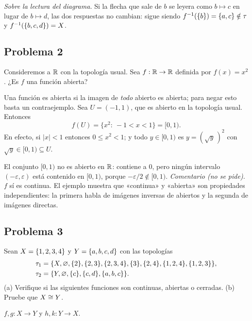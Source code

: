 \emph{Sobre la lectura del diagrama.} Si la flecha que sale de $b$ se leyera como $b\mapsto c$ en lugar de
$b\mapsto d$, las dos respuestas no cambian: sigue siendo $f^{-1}(\{b\})=\{a,c\}\notin\tau$ y
$f^{-1}(\{b,c,d\})=X$.

\subsection{Problema 2}
\begin{enunciado}
Consideremos a $\mathbb{R}$ con la topología usual. Sea $f:\mathbb{R}\to\mathbb{R}$ definida por $f(x)=x^2$. ¿Es $f$ una función abierta?
\end{enunciado}
Una función es abierta si la imagen de \emph{todo} abierto es abierta; para negar esto basta un contraejemplo. Sea
$U=(-1,1)$, que es abierto en la topología usual. Entonces
\[ f(U)=\{x^2:\ -1<x<1\}=[0,1). \]
En efecto, si $|x|<1$ entonces $0\le x^2<1$; y todo $y\in[0,1)$ es $y=(\sqrt{y}\,)^2$ con $\sqrt{y}\in[0,1)\subseteq U$.

El conjunto $[0,1)$ no es abierto en $\mathbb{R}$: contiene a $0$, pero ningún intervalo $(-\varepsilon,\varepsilon)$ está
contenido en $[0,1)$, porque $-\varepsilon/2\notin[0,1)$.
\resp{$f(x)=x^2$ \textbf{no es una función abierta}: $f\big((-1,1)\big)=[0,1)$ no es abierto.}
\emph{Comentario (no se pide).} $f$ sí es continua. El ejemplo muestra que «continua» y «abierta» son propiedades
independientes: la primera habla de imágenes inversas de abiertos y la segunda de imágenes directas.

\subsection{Problema 3}
\begin{enunciado}
Sean $X=\{1,2,3,4\}$ y $Y=\{a,b,c,d\}$ con las topologías
\begin{align*}
\tau_1&=\{X,\varnothing,\{2\},\{2,3\},\{2,3,4\},\{3\},\{2,4\},\{1,2,4\},\{1,2,3\}\},\\
\tau_2&=\{Y,\varnothing,\{c\},\{c,d\},\{a,b,c\}\}.
\end{align*}
(a) Verifique si las siguientes funciones son continuas, abiertas o cerradas. (b) Pruebe que $X\cong Y$.
\end{enunciado}
\begin{center}
\hfill
{}\hfill
{}\hfill
{}
\end{center}
$f,g:X\to Y$ y $h,k:Y\to X$.

